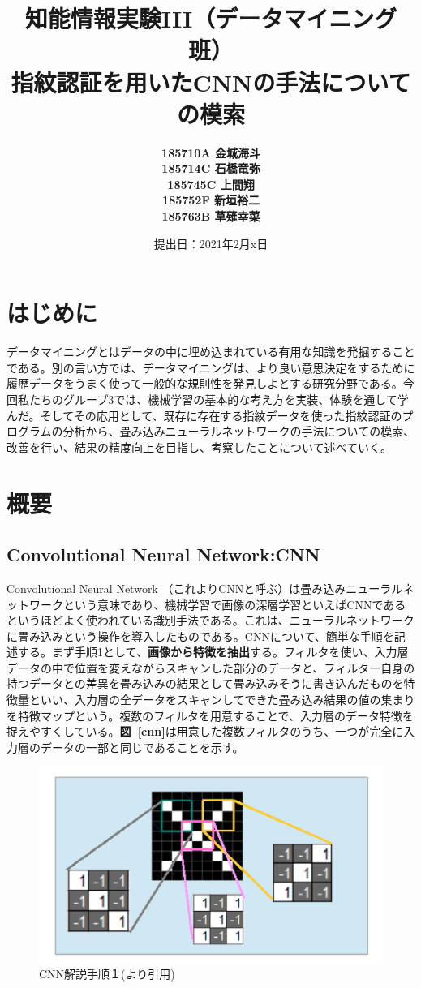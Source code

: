 \documentclass[a4paper, 11pt, titlepage]{jsarticle}
\title{知能情報実験III（データマイニング班）\\指紋認証を用いたCNNの手法についての模索}
\author{\textbf{185710A 金城海斗}\\
\textbf{185714C 石橋竜弥}\\
 \textbf{185745C 上間翔}\\
 \textbf{185752F 新垣裕二}\\
 \textbf{185763B 草薙幸菜}}
\date{提出日：2021年2月x日}
\begin{document}
\maketitle
\tableofcontents
\clearpage


\section{はじめに}
データマイニングとはデータの中に埋め込まれている有用な知識を発掘することである。別の言い方では、データマイニングは、より良い意思決定をするために履歴データをうまく使って一般的な規則性を発見しよとする研究分野である。今回私たちのグループ3では、機械学習の基本的な考え方を実装、体験を通して学んだ。そしてその応用として、既存に存在する指紋データを使った指紋認証のプログラムの分析から、畳み込みニューラルネットワークの手法についての模索、改善を行い、結果の精度向上を目指し、考察したことについて述べていく。
\section{概要}

\subsection{Convolutional Neural Network:CNN}
Convolutional Neural Network （これよりCNNと呼ぶ）は畳み込みニューラルネットワークという意味であり、機械学習で画像の深層学習といえばCNNであるというほどよく使われている識別手法である。これは、ニューラルネットワークに畳み込みという操作を導入したものである。CNNについて、簡単な手順を記述する。まず手順1として、\textbf{画像から特徴を抽出}する。フィルタを使い、入力層データの中で位置を変えながらスキャンした部分のデータと、フィルター自身の持つデータとの差異を畳み込みの結果として畳み込みそうに書き込んだものを特徴量といい、入力層の全データをスキャンしてできた畳み込み結果の値の集まりを特徴マップという。複数のフィルタを用意することで、入力層のデータ特徴を捉えやすくしている。\textbf{図~\ref{cnn}}は用意した複数フィルタのうち、一つが完全に入力層のデータの一部と同じであることを示す。

\begin{figure}[h]
  \centering
  \includegraphics[scale=0.4]{cnn1.png}
  \caption{CNN解説手順１(\cite{cnn}より引用)}
  \label{cnn1}
\end{figure}
\end{document}
